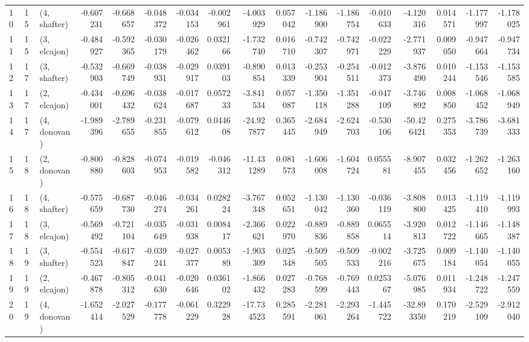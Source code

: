 \begin{tabular}{lllrrrrrrrrrrrrrr}
10 &    15 &  (4, shafter) & -0.607231 & -0.668657 &  -0.048372 & -0.034153 & -0.002961 &  -4.003929 &  0.057042 &  -1.186900 & -1.186754 & -0.010633 &  -4.120316 &  0.014571 & -1.177997 & -1.178025 \\
11 &    15 &  (3, elcajon) & -0.484927 & -0.592365 &  -0.030179 & -0.026462 &  0.032166 &  -1.732740 &  0.016710 &  -0.742307 & -0.742971 & -0.022229 &  -2.771937 &  0.009050 & -0.947664 & -0.947734 \\
12 &    17 &  (3, shafter) & -0.532903 & -0.669749 &  -0.038931 & -0.029917 &  0.039103 &  -0.890854 &  0.013339 &  -0.253904 & -0.254511 & -0.012373 &  -3.876490 &  0.010244 & -1.153546 & -1.153585 \\
13 &    17 &  (2, elcajon) & -0.434001 & -0.696432 &  -0.038624 & -0.017687 &  0.057233 &  -3.841534 &  0.057087 &  -1.350118 & -1.351288 & -0.047109 &  -3.746892 &  0.008850 & -1.068452 & -1.068949 \\
14 &    17 &  (4, donovan) & -1.989396 & -2.789655 &  -0.231855 & -0.079612 &  0.044608 & -24.927877 &  0.365445 &  -2.684949 & -2.624703 & -0.530106 & -50.426421 &  0.275353 & -3.786739 & -3.681333 \\
15 &    18 &  (2, donovan) & -0.800880 & -0.828603 &  -0.074953 & -0.019582 & -0.046312 & -11.431289 &  0.081573 &  -1.606008 & -1.604724 &  0.055581 &  -8.907455 &  0.032456 & -1.262652 & -1.263160 \\
16 &    18 &  (4, shafter) & -0.575659 & -0.687730 &  -0.046274 & -0.034261 &  0.028224 &  -3.767348 &  0.052651 &  -1.130042 & -1.130360 & -0.036119 &  -3.808800 &  0.013425 & -1.119410 & -1.119993 \\
17 &    18 &  (3, elcajon) & -0.569492 & -0.721104 &  -0.035649 & -0.031938 &  0.008417 &  -2.366621 &  0.022970 &  -0.889836 & -0.889858 &  0.065514 &  -3.920813 &  0.012722 & -1.146665 & -1.148387 \\
18 &    19 &  (3, shafter) & -0.554523 & -0.617847 &  -0.039241 & -0.027377 &  0.005389 &  -1.903309 &  0.025348 &  -0.509505 & -0.509533 & -0.002216 &  -3.725675 &  0.009184 & -1.140054 & -1.140055 \\
19 &    19 &  (2, elcajon) & -0.467878 & -0.805312 &  -0.041630 & -0.020646 &  0.036102 &  -1.866432 &  0.027283 &  -0.768599 & -0.769443 &  0.025367 &  -5.076985 &  0.011934 & -1.248722 & -1.247559 \\
20 &    19 &  (4, donovan) & -1.652414 & -2.027529 &  -0.177778 & -0.061229 &  0.322928 & -17.734523 &  0.285591 &  -2.281061 & -2.293264 & -1.445722 & -32.893350 &  0.170219 & -2.529109 & -2.912040 \\

\end{tabular}

